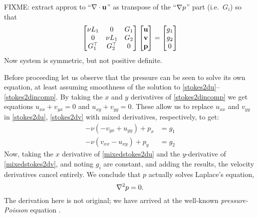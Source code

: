 FIXME: extract approx to ``$\nabla\cdot \mathbf{u}$'' as transpose of the ``$\nabla p$'' part (i.e.~$G_i$) so that
    $$\begin{bmatrix}
    \nu L_1 & 0 & G_1 \\
    0 & \nu L_1 & G_2 \\
    G_1^\top & G_2^\top & 0
    \end{bmatrix}
    \begin{bmatrix}
    \mathbf{u} \\ \mathbf{v} \\ \mathbf{p}
    \end{bmatrix}
    =
    \begin{bmatrix}
    g_1 \\ g_2 \\ 0
    \end{bmatrix}$$
Now system is symmetric, but not positive definite.

Before proceeding let us observe that the pressure can be seen to solve its own equation, at least assuming smoothness of the solution to \eqref{stokes2du}--\eqref{stokes2dincomp}.  By taking the $x$ and $y$ derivatives of \eqref{stokes2dincomp} we get equations $u_{xx} + v_{yx} = 0$ and $u_{xy} + v_{yy} = 0$.  These allow us to replace $u_{xx}$ and $v_{yy}$ in \eqref{stokes2du}, \eqref{stokes2dv} with mixed derivatives, respectively, to get:
\begin{align}
-\nu \left(-v_{yx} + u_{yy}\right) + p_x &= g_1 \label{mixedstokes2du} \\
-\nu \left(v_{xx} - u_{xy}\right) + p_y &= g_2 \label{mixedstokes2dv}
\end{align}
Now, taking the $x$ derivative of \eqref{mixedstokes2du} and the $y$-derivative of \eqref{mixedstokes2dv}, and noting $g_i$ are constant, and adding the results, the velocity derivatives cancel entirely.  We conclude that $p$ actually solves Laplace's equation,
\begin{equation}
\nabla^2 p = 0. \label{pressurepoisson}
\end{equation}
The derivation here is not original; we have arrived at the well-known \emph{pressure-Poisson} equation \citep{Ockendonetal2003}.

